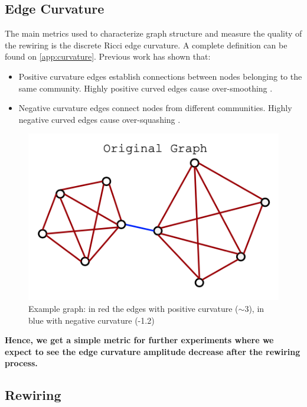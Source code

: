 \documentclass{article}
\theoremstyle{plain}
\theoremstyle{definition}
\theoremstyle{remark}
\begin{document}
\subsection{Edge Curvature}
The main metrics used to characterize graph structure and measure the quality
of the rewiring is the discrete Ricci edge curvature. A complete definition can be found on 
\cref{app:curvature}. Previous work has shown that:
\begin{itemize}
    \item Positive curvature edges establish connections between 
        nodes belonging to the same community.
        Highly positive curved edges cause over-smoothing \cite{nguyen2023revisiting}.
                
    \item Negative curvature edges connect nodes from different communities.
        Highly negative curved edges cause over-squashing \cite{topping2022understandingoversquashingbottlenecksgraphs}.
\end{itemize}
\begin{figure}[ht]

    \vskip -0.2in
    \begin{center}
    \includegraphics[width=0.6\columnwidth]{figures/original_graph.png}
    \caption{\scriptsize Example graph: in red the edges with positive curvature ($\sim 3$), 
    in blue with negative curvature (-1.2) \cite{attali2024delaunay}}
    \label{fig:edge_curvature}
    \end{center}
    \vskip -0.2in
\end{figure}
\textbf{Hence, we get a simple metric for further experiments where we expect to see the 
edge curvature amplitude decrease after the rewiring process.}

\subsection{Rewiring}
\end{document}

